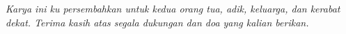 \begin{center}
\emph{ Karya ini ku persembahkan untuk kedua orang tua, adik, keluarga, dan kerabat dekat. Terima kasih atas segala dukungan dan doa yang kalian berikan.}
\end{center}

